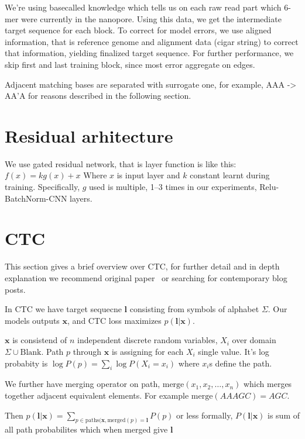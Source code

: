 \documentclass[runningheads,a4paper]{llncs}
\begin{document}
We're using basecalled knowledge which tells us on each raw read part which 6-mer were currently in the nanopore. Using this data, we get the intermediate target sequence for each block. To correct for model errors, we use aligned information, that is reference genome and alignment data (cigar string) to correct that information, yielding finalized target sequence. For further performance, we skip first and last training block, since most error aggregate on edges.

Adjacent matching bases are separated with surrogate one, for example, AAA -> AA'A for reasons described in the following section.

\section{Residual arhitecture}

We use gated residual network, that is layer function is like this: $f(x) = k g(x) + x$ Where $x$ is input layer and $k$ constant learnt during training. Specifically, $g$ used is multiple, 1--3 times in our experiments, Relu-BatchNorm-CNN layers.

\section{CTC}

This section gives a brief overview over CTC, for further detail and in depth explanation we recommend original paper~\cite{graves2006connectionist} or searching for contemporary blog posts.

In CTC we have target sequecne $\mathbf{l}$ consisting from symbols of alphabet $\Sigma$. Our models outputs $\mathbf{x}$, and CTC loss maximizes $p(\mathbf{l}|\mathbf{x})$.

$\mathbf{x}$ is consistend of $n$ independent discrete random variables, $X_i$  over domain $\Sigma \cup \text{Blank}$. Path $p$ through $\mathbf{x}$ is assigning for each $X_i$ single value. It's log probabity is $\log P(p) = \sum_i {\log P(X_i=x_i)}$ where $x_i$s define the path.

We further have merging operator on path, $\text{merge}(x_1, x_2, \ldots, x_n)$ which merges together adjacent equivalent elements. For example $\text{merge}(AAAGC) = AGC$.

Then $p(\mathbf{l}|\mathbf{x}) = \sum_{p\in\text{paths}(\mathbf{x}, \text{merged}(p) = \mathbf{l}}{P(p)}$ or less formally, $P(\mathbf{l}|\mathbf{x})$ is sum of all path probabilites which when merged give $\mathbf{l}$
\end{document}
